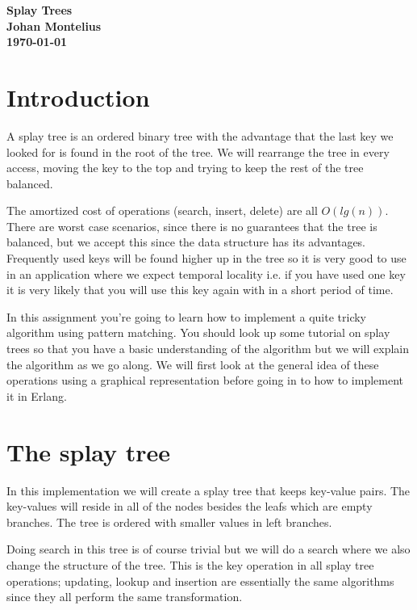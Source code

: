 \documentclass[a4paper,11pt]{article}
\newcommand{\nnsection}[1]{
\section*{#1}
\addcontentsline{toc}{section}{#1}
}
\begin{document}
\begin{center}
\vspace{20pt}
\textbf{\large Splay Trees}\\
\vspace{10pt}
\textbf{Johan Montelius}\\ 
\vspace{10pt}
\textbf{\today}
\end{center}

\nnsection{Introduction}

A splay tree is an ordered binary tree with the advantage that the
last key we looked for is found in the root of the tree. We will 
rearrange the tree in every access, moving the key to the top and
trying to keep the rest of the tree balanced.

The amortized cost of operations (search, insert, delete) are all
$O(lg(n))$. There are worst case scenarios, since there is no
guarantees that the tree is balanced, but we accept this since the data
structure has its advantages. Frequently used keys will be found
higher up in the tree so it is very good to use in an application
where we expect temporal locality i.e. if you have used one key it is
very likely that you will use this key again with in a short period of time.

In this assignment you're going to learn how to implement a quite
tricky algorithm using pattern matching. You should look up some
tutorial on splay trees so that you have a basic understanding of the
algorithm but we will explain the algorithm as we go along. We will
first look at the general idea of these operations using a graphical
representation before going in to how to implement it in Erlang.


\section{The splay tree}

In this implementation we will create a splay tree that keeps
key-value pairs. The key-values will reside in all of the nodes
besides the leafs which are empty branches. The tree is ordered with
smaller values in left branches.

Doing search in this tree is of course trivial but we will do a search
where we also change the structure of the tree. This is the key
operation in all splay tree operations; updating, lookup and insertion
are essentially the same algorithms since they all perform the same
transformation.
\end{document}
